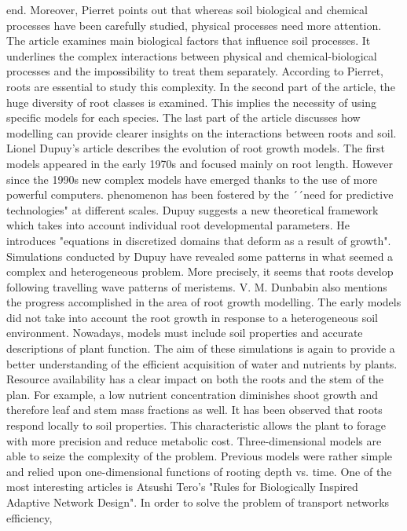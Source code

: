 end. Moreover, Pierret points out that whereas soil biological and chemical processes
have been carefully studied, physical processes need more attention. The article examines
main biological factors that influence soil processes. It underlines the complex interactions
between physical and chemical-biological processes and the impossibility to treat them
separately. According to Pierret, roots are essential to study this complexity. In the
second part of the article, the huge diversity of root classes is examined. This implies the
necessity of using specific models for each species. The last part of the article discusses
how modelling can provide clearer insights on the interactions between roots and soil.
Lionel Dupuy’s article describes the evolution of root growth models. The first models
appeared in the early 1970s and focused mainly on root length. However since the 1990s
new complex models have emerged thanks to the use of more powerful computers.
phenomenon has been fostered by the ´´need for predictive technologies" at different scales.
Dupuy suggests a new theoretical framework which takes into account individual root
developmental parameters. He introduces "equations in discretized domains that deform
as a result of growth". Simulations conducted by Dupuy have revealed some patterns in
what seemed a complex and heterogeneous problem. More precisely, it seems that roots
develop following travelling wave patterns of meristems.
V. M. Dunbabin also mentions the progress accomplished in the area of root growth
modelling. The early models did not take into account the root growth in response to
a heterogeneous soil environment. Nowadays, models must include soil properties and
accurate descriptions of plant function. The aim of these simulations is again to provide a better understanding of the efficient acquisition of water and nutrients by plants. Resource
availability has a clear impact on both the roots and the stem of the plan. For example,
a low nutrient concentration diminishes shoot growth and therefore leaf and stem mass
fractions as well. It has been observed that roots respond locally to soil properties. This
characteristic allows the plant to forage with more precision and reduce metabolic cost.
Three-dimensional models are able to seize the complexity of the problem. Previous
models were rather simple and relied upon one-dimensional functions of rooting depth vs.
time.
One of the most interesting articles is Atsushi Tero’s "Rules for Biologically Inspired
Adaptive Network Design". In order to solve the problem of transport networks efficiency,

